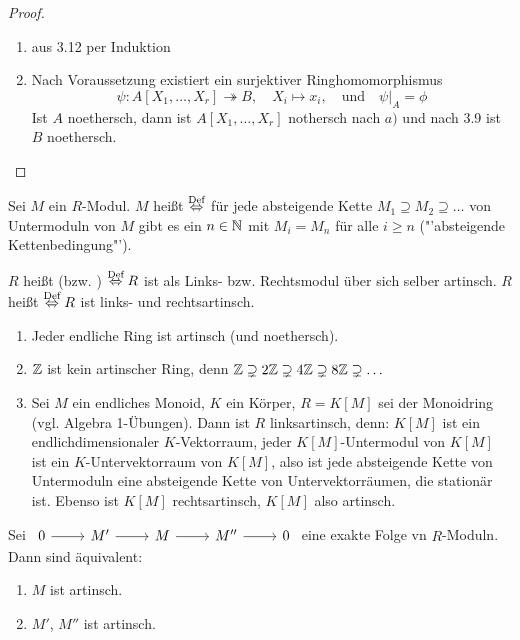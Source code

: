 \begin{proof}
	\begin{enumerate}[label= \alph*)]
		\item aus 3.12 per Induktion
		\item Nach Voraussetzung existiert ein surjektiver Ringhomomorphismus 
		$$\psi: A[X_1, \ldots, X_r] \twoheadrightarrow B, \quad X_i \mapsto x_i, \quad \text{und} \quad \psi\big|_A = \phi$$
		Ist $A$ noethersch, dann ist $A[X_1, \ldots, X_r]$ nothersch nach $a)$ und nach 3.9 ist $B$ noethersch.
	\end{enumerate}
\end{proof}
\begin{df}\label{df3.14}
	Sei $M$ ein $R$-Modul. $M$ heißt  $\overset{\text{Def}}{\Leftrightarrow}$ für jede absteigende Kette $M_1 \supseteq M_2 \supseteq \ldots$ von Untermoduln von $M$ gibt es ein $n\in \mathbb{N}$ mit $M_i = M_n$ für alle $i\geq n$ ("'absteigende Kettenbedingung"').
\end{df}
\begin{df}\label{df3.15}
	$R$ heißt  (bzw. ) $\overset{\text{Def}}{\Leftrightarrow} R$ ist als Links- bzw. Rechtsmodul über sich selber artinsch. $R$ heißt  $\overset{\text{Def}}{\Leftrightarrow} R$ ist links- und rechtsartinsch.
\end{df}
\begin{bsp}
	\begin{enumerate}[label= \alph*)]
		\item Jeder endliche Ring ist artinsch (und noethersch).
		\item $\mathbb{Z}$ ist kein artinscher Ring, denn $\mathbb{Z} \supsetneq 2\mathbb{Z}\supsetneq 4 \mathbb{Z} \supsetneq 8\mathbb{Z} \supsetneq \ldots$
		\item Sei $M$ ein endliches Monoid, $K$ ein Körper, $R= K[M]$ sei der Monoidring (vgl. Algebra 1-Übungen). Dann ist $R$ linksartinsch, denn: $K[M]$ ist ein endlichdimensionaler $K$-Vektorraum, jeder $K[M]$-Untermodul von $K[M]$ ist ein $K$-Untervektorraum von $K[M]$, also ist jede absteigende Kette von Untermoduln eine absteigende Kette von Untervektorräumen, die stationär ist. Ebenso ist $K[M]$ rechtsartinsch, $K[M]$ also artinsch.
	\end{enumerate}
\end{bsp}
\begin{bem}\label{bem3.17}
	Sei $\begin{tikzcd}
	0 \arrow{r} & M' \arrow{r} & M\arrow{r}  & M'' \arrow{r} & 0
	\end{tikzcd}$ eine exakte Folge vn $R$-Moduln. Dann sind äquivalent:
	\begin{enumerate}[label= \roman*)]
		\item $M$ ist artinsch.
		\item $M'$, $M''$ ist artinsch.
	\end{enumerate}
\end{bem}
